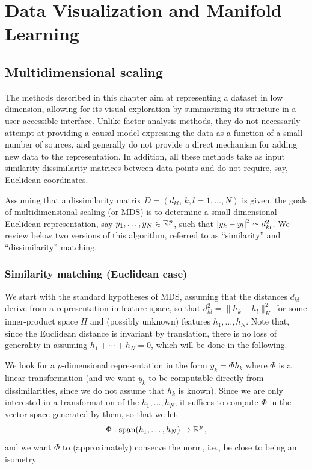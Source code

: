 




\chapter{Data Visualization and Manifold Learning}
\label{chap:manifold.learning}



\section{Multidimensional scaling}
The methods described in this chapter aim at representing a dataset in low dimension, allowing for its visual exploration by summarizing its structure in a user-accessible interface. Unlike factor analysis methods, they do not necessarily attempt at providing a causal model expressing the data as a function of a small number of sources, and generally do not provide a direct mechanism for adding new data to the representation. 
In addition, all these methods take as input similarity dissimilarity matrices between data points and do not require, say, Euclidean coordinates.

Assuming that a dissimilarity matrix $D = (d_{kl}, \,k,l=1, \ldots, N)$ is given, the goals of multidimensional scaling (or MDS) is to determine a small-dimensional Euclidean representation, say $y_1, \ldots, y_N\in {\mathbb{R}}^p$, such that $\left| y_k - y_l \right|^2  \simeq
d_{kl}^2$. We review below two versions of this algorithm, referred to as ``similarity'' and ``dissimilarity'' matching.

\subsection{Similarity matching (Euclidean case)}
We start with the standard hypotheses of  MDS, assuming that the distances $d_{kl}$ derive from a representation in feature space, so that $d_{kl}^2 = \|h_k - h_l\|_H^2$ for some inner-product space $H$ and (possibly unknown) features $h_1, \ldots, h_N$. Note that, since the Euclidean distance is invariant by translation, there is no loss of generality in assuming $h_1 + \cdots + h_N=0$, which will be done in the following.

We look for a $p$-dimensional representation in the form  $y_k = \Phi h_k$ where $\Phi$ is a linear transformation (and we want $y_k$ to be computable directly from dissimilarities, since we do not assume that $h_k$ is known). Since we are only interested in a transformation of the $h_1, \ldots, h_N$, it suffices to compute $\Phi$ in the vector space generated by them, so that we let
\[
\Phi: \mathrm{span}(h_1, \ldots, h_N) \to {\mathbb{R}}^p\,,
\]
and we want $\Phi$ to
(approximately) conserve the norm, i.e., be close to being an isometry. 

